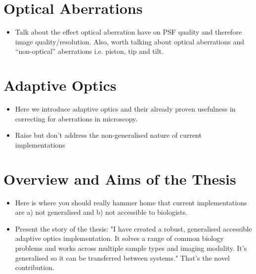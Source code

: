 \section{Optical Aberrations}
\label{sec:aberrations}

\begin{itemize}
	\item Talk about the effect optical aberration have on PSF quality and therefore image quality/resolution. Also, worth talking about optical aberrations and ``non-optical'' aberrations i.e. piston, tip and tilt.
\end{itemize}

\section{Adaptive Optics}
\label{sec:AO}

\begin{itemize}
	\item Here we introduce adaptive optics and their already proven usefulness in correcting for aberrations in microscopy.
	\item Raise but don't address the non-generalised nature of current implementations
\end{itemize}

\section{Overview and Aims of the Thesis}
\label{sec:overview}

\begin{itemize}
	\item Here is where you should really hammer home that current implementations are a) not generalised and b) not accessible to biologists.
	\item Present the story of the thesis: "I have created a robust, generalised accessible adaptive optics implementation. It solves a range of common biology problems and works across multiple sample types and imaging modality. It's generalised so it can be transferred between systems." That's the novel contribution.
\end{itemize}